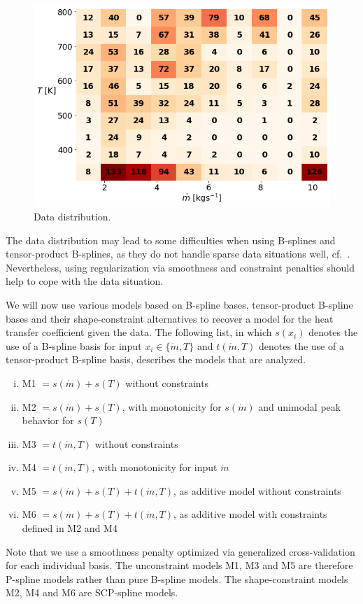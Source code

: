 \begin{figure}[H]
	\centering
	\includegraphics[width=0.8\columnwidth]{graphics/pgfplots/cha5/Ebner/data_distribution.png}
	\caption{Data distribution.}
	\label{fig:ebner_data_situation}
\end{figure}

The data distribution may lead to some difficulties when using B-splines and tensor-product B-splines, as they do not handle sparse data situations well, cf.~. Nevertheless, using regularization via smoothness and constraint penalties should help to cope with the data situation. 

We will now use various models based on B-spline bases, tensor-product B-spline bases and their shape-constraint alternatives to recover a model for the heat transfer coefficient given the data. The following list, in which $s(x_i)$ denotes the use of a B-spline basis for input $x_i \in \{\dot{m}, T\}$ and $t(\dot{m}, T)$ denotes the use of a tensor-product B-spline basis, describes the models that are analyzed. 

\begin{enumerate}[(i)]
	\item M1 $= s(\dot{m}) + s(T)$ without constraints
	\item M2 $= s(\dot{m}) + s(T)$, with monotonicity for $s(\dot{m})$ and unimodal peak behavior for $s(T)$
	\item M3 $= t(\dot{m}, T)$ without constraints
	\item M4 $= t(\dot{m}, T)$, with monotonicity for input $\dot{m}$
	\item M5 $= s(\dot{m}) + s(T) + t(\dot{m}, T)$, as additive model without constraints
	\item M6 $= s(\dot{m}) + s(T) + t(\dot{m}, T)$, as additive model with constraints defined in M2 and M4
\end{enumerate}
%
Note that we use a smoothness penalty optimized via generalized cross-validation for each individual basis. The unconstraint models M1, M3 and M5 are therefore P-spline models rather than pure B-spline models. The shape-constraint models M2, M4 and M6 are SCP-spline models. 


